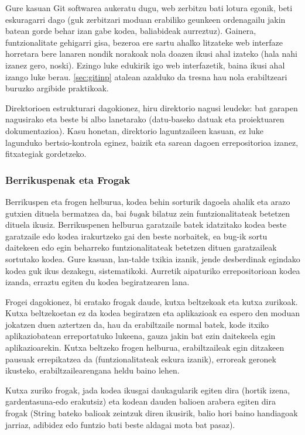 Gure kasuan Git softwarea aukeratu dugu, web zerbitzu bati lotura egonik, beti eskuragarri dago (guk zerbitzari moduan erabiliko geunkeen ordenagailu jakin batean gorde behar izan gabe kodea, baliabideak aurreztuz). Gainera, funtzionalitate gehigarri gisa, bezeroa ere sartu ahalko litzateke web interfaze horretara bere lanaren nondik norakoak nola doazen ikusi ahal izateko (hala nahi izanez gero, noski). Ezingo luke edukirik igo web interfazetik, baina ikusi ahal izango luke berau. \ref{sec:gitinp} atalean azalduko da tresna hau nola erabiltzeari buruzko argibide praktikoak.

Direktorioen estrukturari dagokionez, hiru direktorio nagusi leudeke: bat garapen nagusirako eta beste bi albo lanetarako (datu-baseko datuak eta proiektuaren dokumentazioa). Kasu honetan, direktorio laguntzaileen kasuan, ez luke lagunduko bertsio-kontrola eginez, baizik eta sarean dagoen errepositorioa izanez, fitxategiak gordetzeko.

\subsubsection{Berrikuspenak eta Frogak}
Berrikuspen eta frogen helburua, kodea behin sorturik dagoela ahalik eta arazo gutxien dituela bermatzea da, bai \textit{bug}ak bilatuz zein funtzionalitateak betetzen dituela ikusiz. Berrikuspenen helburua garatzaile batek idatzitako kodea beste garatzaile edo kodea irakurtzeko gai den beste norbaitek, ea bug-ik sortu daitekeen edo egin beharreko funtzionalitateak betetzen dituen garatzaileak sortutako kodea. Gure kasuan, lan-talde txikia izanik, jende desberdinak egindako kodea guk ikus dezakegu, sistematikoki. Aurretik aipaturiko errepositorioan kodea izanda, erraztu egiten du kodea begiratzearen lana. 
 
Frogei dagokionez, bi eratako frogak daude, kutxa beltzekoak eta kutxa zurikoak. Kutxa beltzekoetan ez da kodea begiratzen eta aplikazioak ea espero den moduan jokatzen duen aztertzen da, hau da erabiltzaile normal batek, kode itxiko aplikaziobatean erreportatuko lukeena, gauza jakin bat ezin daitekeela egin aplikazioarekin. Kutxa beltzeko frogen helburua, erabiltzaileak egin ditzakeen pausuak errepikatzea da (funtzionalitateak eskura izanik), erroreak geronek ikusteko, erabiltzailearengana heldu baino lehen.

Kutxa zuriko frogak, jada kodea ikusgai daukagularik egiten dira (hortik izena, gardentasuna-edo erakutsiz) eta kodean dauden balioen arabera egiten dira frogak (String bateko balioak zeintzuk diren ikusirik, balio hori baino handiagoak jarriaz, adibidez edo funtzio bati beste aldagai mota bat pasaz). 

